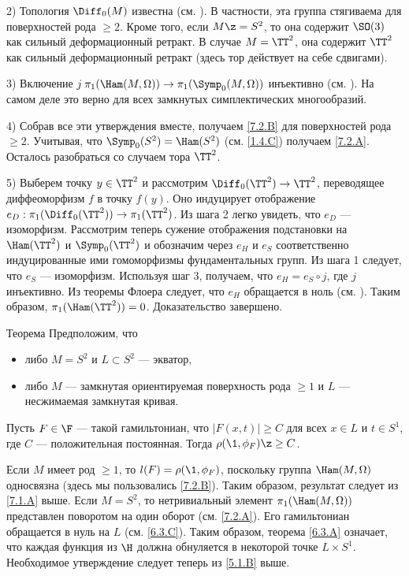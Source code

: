 2) Топология $\Diff_0 (M)$ известна (см. \cite{EE}).
В частности, эта группа стягиваема для поверхностей рода $\ge 2$.
Кроме того, если $M \z= S^2$, то она содержит $\SO (3)$ как сильный деформационный ретракт.
В случае $M = \TT^2$, она содержит $\TT^2$ как сильный деформационный ретракт (здесь тор действует на себе сдвигами).

3) Включение $j\: \pi_1 (\Ham (M, \Omega)) \to \pi_1 (\Symp_0 (M, \Omega))$ инъективно (см. \cite[10.18 iii]{MS}).
На самом деле это верно для всех замкнутых симплектических многообразий.

4) Собрав все эти утверждения вместе, получаем \ref{7.2.B} для поверхностей рода $\ge 2$.
Учитывая, что $\Symp_0 (S^2) = \Ham (S^2)$ (см. \ref{1.4.C}) получаем \ref{7.2.A}.
Осталось разобраться со случаем тора $\TT^2$.

5) Выберем точку $y \in \TT^2$ и рассмотрим  $\Diff_0 (\TT^2) \to \TT^2$, переводящее диффеоморфизм $f$ в точку $f(y)$.
Оно индуцирует отображение $e_D: \pi_1 (\Diff_0 (\TT^2)) \to \pi_1 (\TT^2)$.
Из шага 2 легко увидеть, что $e_D$ --- изоморфизм.
Рассмотрим теперь сужение отображения подстановки на $\Ham (\TT^2)$ и $\Symp_0 (\TT^2)$ и обозначим через $e_H$ и $e_S$ соответственно индуцированные ими гомоморфизмы фундаментальных групп.
Из шага 1 следует, что $e_S$ --- изоморфизм.
Используя шаг 3, получаем, что $e_H = e_S \circ j$, где $j$ инъективно.
Из теоремы Флоера следует, что $e_H$ обращается в ноль (см. \cite{LMP1}).
Таким образом, $\pi_1 (\Ham (\TT^2)) = 0$.
Доказательство завершено. 
\qeds

\begin{thm}[(\cite{P5})]{Теорема}\label{7.2.C}
Предположим, что 
\begin{itemize}
\item либо $M = S^2$ и $L \subset S^2$ --- экватор, 
\item либо $M$ --- замкнутая ориентируемая поверхность рода $\ge 1$ и $L$ --- несжимаемая замкнутая кривая.
\end{itemize}
Пусть $F \in \F$ --- такой гамильтониан, что $|F(x,t)| \ge C$ для всех $x \in L$ и $t \in S^1$, где $C$ --- положительная постоянная.
Тогда $\rho (\1, \phi_F) \z\ge C$.
\end{thm}

Если $M$ имеет род $\ge 1$, то $l (F) = \rho (\1, \phi_F)$, поскольку группа $\Ham (M, \Omega)$ односвязна (здесь мы пользовались \ref{7.2.B}).
Таким образом, результат следует из \ref{7.1.A} выше.
Если $M = S^2$, то нетривиальный элемент $\pi_1 (\Ham (M, \Omega))$ представлен поворотом на один оборот (см. \ref{7.2.A}).
Его гамильтониан обращается в нуль на $L$ (см. \ref{6.3.C}).
Таким образом, теорема \ref{6.3.A} означает, что каждая функция из $\H$ должна обнуляется в некоторой точке $L \times S^1$.
Необходимое утверждение следует теперь из \ref{5.1.B} выше.
\qeds

